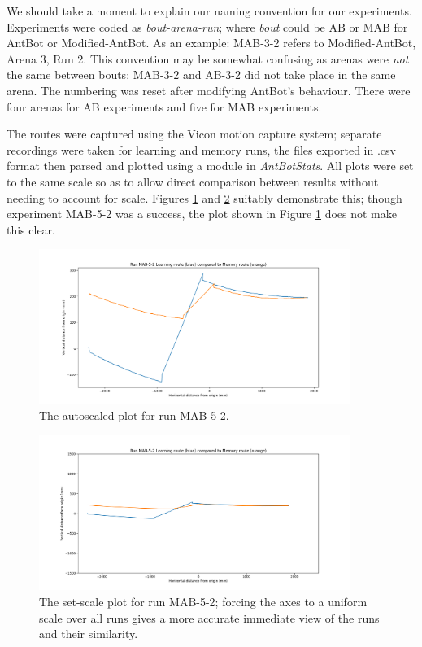 \documentclass[a4paper,12pt,twoside,openright]{article}
\begin{document}
We should take a moment to explain our naming convention for our experiments. Experiments were coded as \textit{bout-arena-run}; where \textit{bout} could be
AB or MAB for AntBot or Modified-AntBot. As an example: MAB-3-2 refers to Modified-AntBot, Arena 3, Run 2. This convention may
be somewhat confusing as arenas were \textit{not} the same between bouts; MAB-3-2 and AB-3-2 did not take place in the same arena. The
numbering was reset after modifying AntBot's behaviour. There were four arenas for AB experiments and five for MAB experiments.
\newline

The routes were captured using the Vicon motion capture system; separate recordings were taken for learning and memory runs, the
files exported in .csv format then parsed and plotted using a module in \textit{AntBotStats}. All plots were set to the same scale
so as to allow direct comparison between results without needing to account for scale. Figures \ref{fig:autoscalerun} and \ref{fig:setscalerun}
suitably demonstrate this; though experiment MAB-5-2 was a success, the plot shown in Figure \ref{fig:autoscalerun} does not make this clear.

\begin{figure}
  \centering
  \includegraphics[width=0.9\textwidth]{MAB-5-2}
  \caption{
   \label{fig:autoscalerun}The autoscaled plot for run MAB-5-2.
  }
\end{figure}

\begin{figure}
  \centering
  \includegraphics[width=0.9\textwidth]{MAB-5-2-S}
  \caption{\label{fig:setscalerun}The set-scale plot for run MAB-5-2; forcing the axes to a uniform scale over all runs gives a more accurate immediate
      view of the runs and their similarity.}
\end{figure}
\end{document}
